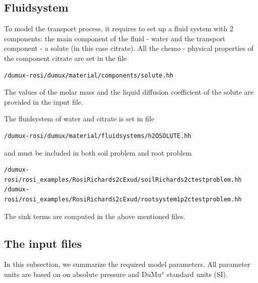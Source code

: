 \subsection*{Fluidsystem}

To model the transport process, it requires to set up a fluid system
with 2 components: the main component of the fluid - water and the
transport component - a solute (in this case citrate). All the chemo - physical properties of the component citrate are set in the file

\begin{lstlisting}
/dumux-rosi/dumux/material/components/solute.hh
\end{lstlisting}


The values of the molar mass and the liquid diffusion coefficient of the solute are provided in the input file. 

The fluidsystem of water and citrate is set in file

\begin{lstlisting}
/dumux-rosi/dumux/material/fluidsystems/h2OSOLUTE.hh
\end{lstlisting}

and must be included in both soil problem and root problem

\begin{lstlisting}
/dumux-rosi/rosi_examples/RosiRichards2cExud/soilRichards2ctestproblem.hh
/dumux-rosi/rosi_examples/RosiRichards2cExud/rootsystem1p2ctestproblem.hh
\end{lstlisting}

The sink terms are computed in the above mentioned files.





\subsection*{The input files}

In this subsection, we summarize the required model parameters. All
parameter units are based on on absolute pressure and DuMu$^{x}$
standard units (SI).

